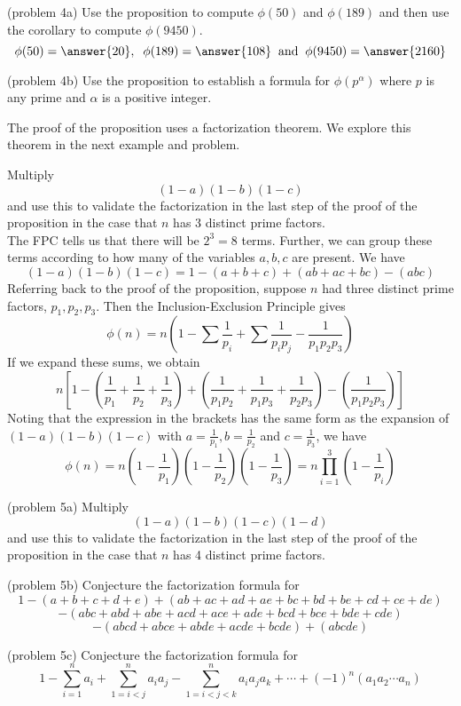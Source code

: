 \documentclass[handout]{ximera}
\begin{document}
\begin{problem}(problem 4a)
Use the proposition to compute $\phi(50)$ and $\phi(189)$ and then use the corollary to compute 
$\phi(9450)$.\\
\[
\phi(50) = \answer{20}, \;\; \phi(189) = \answer{108} \;\; \text{and} \;\; \phi(9450)= \answer{2160}
\]
\end{problem}

\begin{problem}(problem 4b)
Use the proposition to establish a formula for $\phi(p^\alpha)$ where $p$ is any prime and $\alpha$ is a positive integer.
\end{problem}


The proof of the proposition uses a factorization theorem. We explore this theorem in the next example and problem.

\begin{example}[example 5]
Multiply
\[
(1-a)(1-b)(1-c)
\]
and use this to validate the factorization in the last step of the proof of the proposition in the case that $n$ has 3 distinct prime factors.\\
The FPC tells us that there will be $2^3 = 8$ terms.  Further, we can group these terms according to how many of the variables $a, b, c$ are present. We have
\[
(1-a)(1-b)(1-c) = 1 - (a+b+c) + (ab+ac+bc) - (abc)
\]
Referring back to the proof of the proposition, suppose $n$ had three distinct prime factors, $p_1, p_2, p_3$.
Then the Inclusion-Exclusion Principle gives
\[
\phi(n) = n\left(1 - \sum \frac{1}{p_i} + \sum \frac{1}{p_ip_j} - \frac{1}{p_1p_2p_3}\right)
\]
If we expand these sums, we obtain 
\[
n\left[1 - \left(\frac{1}{p_1} + \frac{1}{p_2}+\frac{1}{p_3}\right) + \left(\frac{1}{p_1p_2} + \frac{1}{p_1p_3} + \frac{1}{p_2p_3}\right) - \left(\frac{1}{p_1p_2p_3}\right)\right]
\]
Noting that the expression in the brackets has the same form as the expansion of $(1-a)(1-b)(1-c)$ with $a = \frac{1}{p_1},
b= \frac{1}{p_2}$ and $c = \frac{1}{p_3}$, we have
\[
 \phi(n) = n\left(1 - \frac{1}{p_1}\right)\left(1 - \frac{1}{p_2}\right)\left(1 - \frac{1}{p_3}\right) = n \prod_{i = 1}^3\left(1 - \frac{1}{p_i}\right)
 \]
 \end{example}
 
 \begin{problem}(problem 5a)
 Multiply
\[
(1-a)(1-b)(1-c)(1-d)
\]
and use this to validate the factorization in the last step of the proof of the proposition in the case that $n$ has 4 distinct prime factors.
\end{problem}

\begin{problem}(problem 5b)
Conjecture the factorization formula for
\[
1 - (a + b+c+d+e) + (ab+ac+ad+ae+bc+bd+be+cd+ce+de) 
\]
\[
- (abc+abd+abe+acd+ace+ade+bcd+bce+bde+cde) 
\]
\[
- (abcd+abce+abde+acde+bcde) + (abcde)
\]
\end{problem}

\begin{problem}(problem 5c)
Conjecture the factorization formula for
\[
1 - \sum_{i = 1}^n a_i + \sum_{1 = i <j}^n a_ia_j - \sum_{1 = i <j<k}^n a_ia_ja_k + \cdots + (-1)^n (a_1a_2\cdots a_n)
\]
\end{problem}
\end{document}
